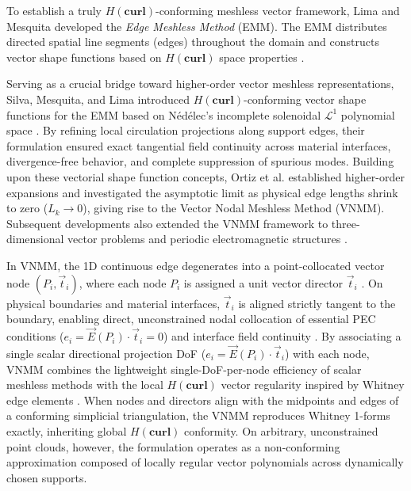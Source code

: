 \documentclass[preprint,12pt]{elsarticle}
\begin{document}
To establish a truly $H(\mathbf{curl})$-conforming meshless vector framework, Lima and Mesquita \cite{lima2017edge} developed the \emph{Edge Meshless Method} (EMM). The EMM distributes directed spatial line segments (edges) throughout the domain and constructs vector shape functions based on $H(\mathbf{curl})$ space properties \cite{lima2017edge, lima2016metodos}. 

Serving as a crucial bridge toward higher-order vector meshless representations, Silva, Mesquita, and Lima \cite{silva2018new} introduced $H(\mathbf{curl})$-conforming vector shape functions for the EMM based on N\'ed\'elec's incomplete solenoidal $\mathcal{L}^1$ polynomial space \cite{nedelec1980mixed}. By refining local circulation projections along support edges, their formulation ensured exact tangential field continuity across material interfaces, divergence-free behavior, and complete suppression of spurious modes. Building upon these vectorial shape function concepts, Ortiz et al. \cite{ortiz2021creating, ortiz2021nodal, ortiz2023tese} established higher-order expansions and investigated the asymptotic limit as physical edge lengths shrink to zero ($L_k \to 0$), giving rise to the Vector Nodal Meshless Method (VNMM). Subsequent developments also extended the VNMM framework to three-dimensional vector problems \cite{goncalves2023vector, goncalves2025tese} and periodic electromagnetic structures \cite{goncalves2026periodic}.

In VNMM, the 1D continuous edge degenerates into a point-collocated vector node $(P_i, \vec{t}_i)$, where each node $P_i$ is assigned a unit vector director $\vec{t}_i$ \cite{ortiz2021nodal, ortiz2023tese}. On physical boundaries and material interfaces, $\vec{t}_i$ is aligned strictly tangent to the boundary, enabling direct, unconstrained nodal collocation of essential PEC conditions ($e_i = \vec{E}(P_i) \cdot \vec{t}_i = 0$) and interface field continuity \cite{ortiz2021nodal, goncalves2025tese}. By associating a single scalar directional projection DoF ($e_i = \vec{E}(P_i) \cdot \vec{t}_i$) with each node, VNMM combines the lightweight single-DoF-per-node efficiency of scalar meshless methods with the local $H(\mathbf{curl})$ vector regularity inspired by Whitney edge elements \cite{ortiz2021nodal, goncalves2023vector, goncalves2025tese}. When nodes and directors align with the midpoints and edges of a conforming simplicial triangulation, the VNMM reproduces Whitney 1-forms exactly, inheriting global $H(\mathbf{curl})$ conformity. On arbitrary, unconstrained point clouds, however, the formulation operates as a non-conforming approximation composed of locally regular vector polynomials across dynamically chosen supports.
\end{document}
